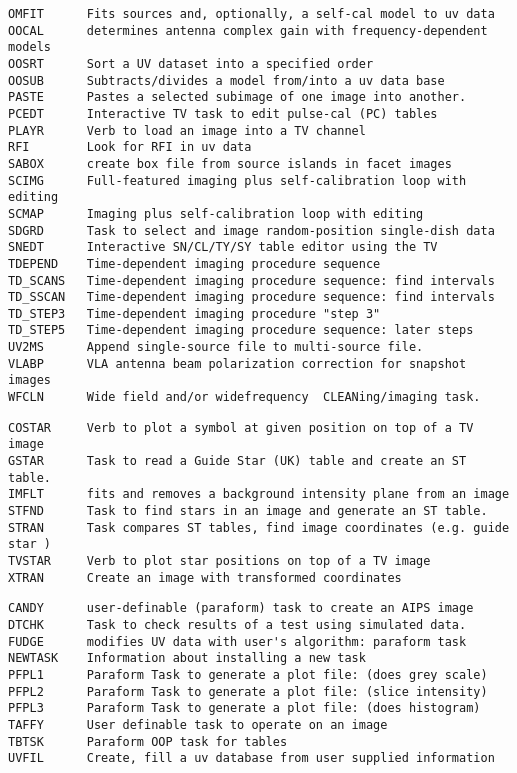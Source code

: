 \begin{verbatim}
OMFIT      Fits sources and, optionally, a self-cal model to uv data
OOCAL      determines antenna complex gain with frequency-dependent models
OOSRT      Sort a UV dataset into a specified order
OOSUB      Subtracts/divides a model from/into a uv data base
PASTE      Pastes a selected subimage of one image into another.
PCEDT      Interactive TV task to edit pulse-cal (PC) tables
PLAYR      Verb to load an image into a TV channel
RFI        Look for RFI in uv data
SABOX      create box file from source islands in facet images
SCIMG      Full-featured imaging plus self-calibration loop with editing
SCMAP      Imaging plus self-calibration loop with editing
SDGRD      Task to select and image random-position single-dish data
SNEDT      Interactive SN/CL/TY/SY table editor using the TV
TDEPEND    Time-dependent imaging procedure sequence
TD_SCANS   Time-dependent imaging procedure sequence: find intervals
TD_SSCAN   Time-dependent imaging procedure sequence: find intervals
TD_STEP3   Time-dependent imaging procedure "step 3"
TD_STEP5   Time-dependent imaging procedure sequence: later steps
UV2MS      Append single-source file to multi-source file.
VLABP      VLA antenna beam polarization correction for snapshot images
WFCLN      Wide field and/or widefrequency  CLEANing/imaging task.
\end{verbatim}\eve


\vskip 0.5pt
\bbve\begin{verbatim}
COSTAR     Verb to plot a symbol at given position on top of a TV image
GSTAR      Task to read a Guide Star (UK) table and create an ST table.
IMFLT      fits and removes a background intensity plane from an image
STFND      Task to find stars in an image and generate an ST table.
STRAN      Task compares ST tables, find image coordinates (e.g. guide star )
TVSTAR     Verb to plot star positions on top of a TV image
XTRAN      Create an image with transformed coordinates
\end{verbatim}\eve


\vskip 0.5pt
\bbve\begin{verbatim}
CANDY      user-definable (paraform) task to create an AIPS image
DTCHK      Task to check results of a test using simulated data.
FUDGE      modifies UV data with user's algorithm: paraform task
NEWTASK    Information about installing a new task
PFPL1      Paraform Task to generate a plot file: (does grey scale)
PFPL2      Paraform Task to generate a plot file: (slice intensity)
PFPL3      Paraform Task to generate a plot file: (does histogram)
TAFFY      User definable task to operate on an image
TBTSK      Paraform OOP task for tables
UVFIL      Create, fill a uv database from user supplied information
\end{verbatim}\eve

